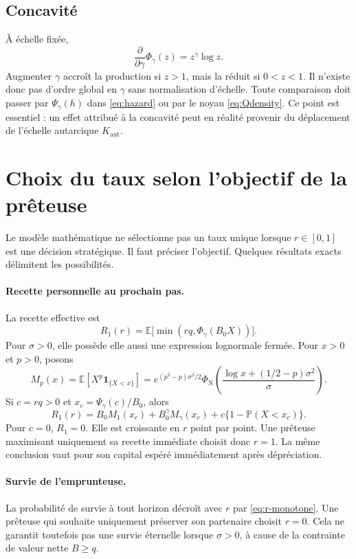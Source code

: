 \documentclass[11pt,a4paper]{article}
\newcommand{\E}{\mathbb E}
\newcommand{\Pp}{\mathbb P}
\newcommand{\1}{\mathbf 1}
\theoremstyle{definition}
\theoremstyle{remark}
\begin{document}
\subsection{Concavité}

À échelle fixée,
\[
\frac{\partial}{\partial\gamma}\Phi_\gamma(z)=z^\gamma\log z.
\]
Augmenter $\gamma$ accroît la production si $z>1$, mais la réduit si
$0<z<1$. Il n'existe donc pas d'ordre global en $\gamma$ sans
normalisation d'échelle. Toute comparaison doit passer par
$\Psi_\gamma(h)$ dans \eqref{eq:hazard} ou par le noyau
\eqref{eq:Qdensity}. Ce point est essentiel : un effet attribué à la
concavité peut en réalité provenir du déplacement de l'échelle autarcique
$K_{\mathrm{aut}}$.

\section{Choix du taux selon l'objectif de la prêteuse}

Le modèle mathématique ne sélectionne pas un taux unique lorsque
$r\in[0,1]$ est une décision stratégique. Il faut préciser l'objectif.
Quelques résultats exacts délimitent les possibilités.

\paragraph{Recette personnelle au prochain pas.}
La recette effective est
\begin{equation}
R_1(r)=\E\bigl[\min(rq,\Phi_\gamma(B_0X))\bigr].
\label{eq:immediate-revenue}
\end{equation}
Pour $\sigma>0$, elle possède elle aussi une expression lognormale fermée.
Pour $x>0$ et $p>0$, posons
\begin{equation}
M_p(x)=\E[X^p\1_{\{X<x\}}]
=e^{(p^2-p)\sigma^2/2}
\Phi_{\mathrm N}\!\left(
\frac{\log x+(1/2-p)\sigma^2}{\sigma}\right).
\label{eq:truncated-moment}
\end{equation}
Si $c=rq>0$ et $x_c=\Psi_\gamma(c)/B_0$, alors
\begin{equation}
R_1(r)=B_0M_1(x_c)+B_0^\gamma M_\gamma(x_c)
+c\{1-\Pp(X<x_c)\}.
\label{eq:closed-revenue}
\end{equation}
Pour $c=0$, $R_1=0$.
Elle est croissante en $r$ point par point. Une prêteuse maximisant
uniquement sa recette immédiate choisit donc $r=1$. La même conclusion
vaut pour son capital espéré immédiatement après dépréciation.

\paragraph{Survie de l'emprunteuse.}
La probabilité de survie à tout horizon décroît avec $r$ par
\eqref{eq:r-monotone}. Une prêteuse qui souhaite uniquement préserver son
partenaire choisit $r=0$. Cela ne garantit toutefois pas une survie
éternelle lorsque $\sigma>0$, à cause de la contrainte de valeur nette
$B\geq q$.
\end{document}
